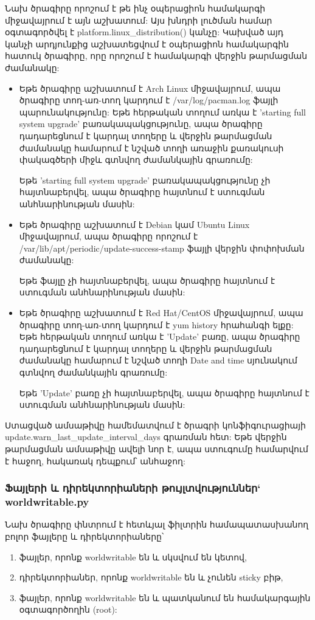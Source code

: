 \documentclass[a4paper,12pt]{article}
\begin{document}
\begin{sloppypar}
Նախ ծրագիրը որոշում է թե ինչ օպերացիոն համակարգի միջավայրում է այն աշխատում:
Այս խնդրի լուծման համար օգտագործվել է platform.linux\_distribution() կանչը:
Կախված այդ կանչի արդյունքից աշխատեցվում է օպերացիոն համակարգին հատուկ
ծրագիրը, որը որոշում է համակարգի վերջին թարմացման ժամանակը:

\begin{itemize}
\item Եթե ծրագիրը աշխատում է Arch Linux միջավայրում, ապա ծրագիրը տող-առ-տող
    կարդում է /var/log/pacman.log ֆայլի պարունակությունը: Եթե հերթական տողում առկա է
	'starting full system upgrade' բառակապակցությունը, ապա ծրագիրը դադարեցնում
	է կարդալ տողերը և վերջին թարմացման ժամանակը համարում է նշված տողի առաջին
	քառակուսի փակագծերի միջև գտնվող ժամանկային գրառումը:

	Եթե 'starting full system upgrade' բառակապակցությունը չի հայտնաբերվել,
	ապա ծրագիրը հայտնում է ստուգման անհնարինության մասին:
\item Եթե ծրագիրը աշխատում է Debian կամ Ubuntu Linux միջավայրում, ապա ծրագիրը
	որոշում է /var/lib/apt/periodic/update-success-stamp ֆայլի վերջին փոփոխման
	ժամանակը:

	Եթե ֆայլը չի հայտնաբերվել, ապա ծրագիրը հայտնում է ստուգման անհնարինության
	մասին:
\item Եթե ծրագիրը աշխատում է Red Hat/CentOS միջավայրում, ապա ծրագիրը տող-առ-տող
    կարդում է yum history հրահանգի ելքը: Եթե հերթական տողում առկա է
	'Update' բառը, ապա ծրագիրը դադարեցնում
	է կարդալ տողերը և վերջին թարմացման ժամանակը համարում է նշված տողի 
	Date and time սյունակում գտնվող ժամանկային գրառումը:

	Եթե 'Update' բառը չի հայտնաբերվել, ապա ծրագիրը հայտնում է ստուգման անհնարինության մասին:
\end{itemize}

Ստացված ամսաթիվը համեմատվում է ծրագրի կոնֆիգուրացիայի
update.warn\_last\_update\_interval\_days
գրառման հետ: Եթե վերջին թարմացման ամսաթիվը ավելի նոր է,
ապա ստուգումը համարվում է հաջող, հակառակ դեպքում՝ անհաջող:


\subsubsection{Ֆայլերի և դիրեկտորիաների թույլտվություններ` worldwritable.py}


Նախ ծրագիրը փնտրում է հետևյալ ֆիլտրին համապատասխանող բոլոր ֆայլերը և դիրեկտորիաները՝

\begin{enumerate}
\item ֆայլեր, որոնք worldwritable են և սկսվում են կետով,
\item դիրեկտորիաներ, որոնք worldwritable են և չունեն sticky բիթ,
\item ֆայլեր, որոնք worldwritable են և պատկանում են համակարգային օգտագործողին (root):
\end{enumerate}


\end{sloppypar}
\end{document}
